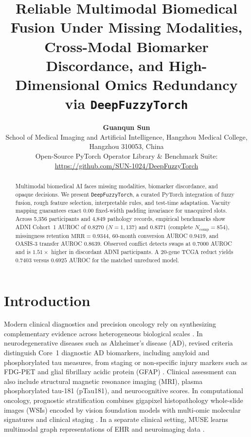 \documentclass[10pt,twocolumn]{article}
\title{\vspace{-1.0em}%
\textbf{Reliable Multimodal Biomedical Fusion Under Missing Modalities, Cross-Modal Biomarker
Discordance, and High-Dimensional Omics Redundancy via \texttt{DeepFuzzyTorch}}}
\author{
\textbf{Guanqun Sun}\\
\small School of Medical Imaging and Artificial Intelligence, Hangzhou Medical College,
Hangzhou 310053, China\\
\small Open-Source PyTorch Operator Library \& Benchmark Suite:
\url{https://github.com/SUN-1024/DeepFuzzyTorch}
}
\date{}
\begin{document}
\maketitle

\begin{abstract}
Multimodal biomedical AI faces missing modalities, biomarker discordance, and opaque decisions.
We present \texttt{DeepFuzzyTorch}, a curated PyTorch integration of fuzzy fusion, rough
feature selection, interpretable rules, and test-time adaptation. Vacuity mapping guarantees
exact $0.00$ fixed-width padding invariance for unacquired slots. Across 5,356 participants and
4,849 pathology records, empirical benchmarks show ADNI Cohort~1 AUROC of $0.8270$ ($N=1,137$)
and $0.8371$ (complete $N_{\mathrm{comp}}=854$), missingness retention $\mathrm{MRR}=0.9344$,
60-month conversion AUROC $0.9419$, and OASIS-3 transfer AUROC $0.8639$. Observed conflict
detects swaps at $0.7000$ AUROC and is $1.51\times$ higher in discordant ADNI participants. A
20-gene TCGA reduct yields $0.7403$ versus $0.6925$ AUROC for the matched unreduced model.
\end{abstract}

\section{Introduction}
\label{sec:intro}

Modern clinical diagnostics and precision oncology rely on synthesizing complementary evidence
across heterogeneous biological scales \cite{baltrusaitis2018multimodal,acosta2022multimodal}.
In neurodegenerative diseases such as Alzheimer's disease (AD), revised criteria distinguish
Core~1 diagnostic AD biomarkers, including amyloid and phosphorylated tau measures, from
staging or non-specific injury markers such as FDG-PET and glial fibrillary acidic protein
(GFAP) \cite{jack2024revised,palmqvist2020discriminative,janelidze2020plasma}. Clinical
assessment can also include structural magnetic resonance imaging (MRI), plasma phosphorylated
tau-181 (pTau181), and neurocognitive scores. In computational oncology, prognostic
stratification combines gigapixel histopathology whole-slide images (WSIs) encoded by vision
foundation models \cite{chen2024uni,lu2024visual,filiot2023scaling,filiot2024phikonv2,%
kaiko2024towards,wang2022transformer,huang2023visual} with multi-omic molecular signatures and
clinical staging \cite{kather2019predicting,jaume2024survpath}. In a separate clinical setting,
MUSE learns multimodal graph representations of EHR and neuroimaging data \cite{wu2024muse}.
\end{document}
